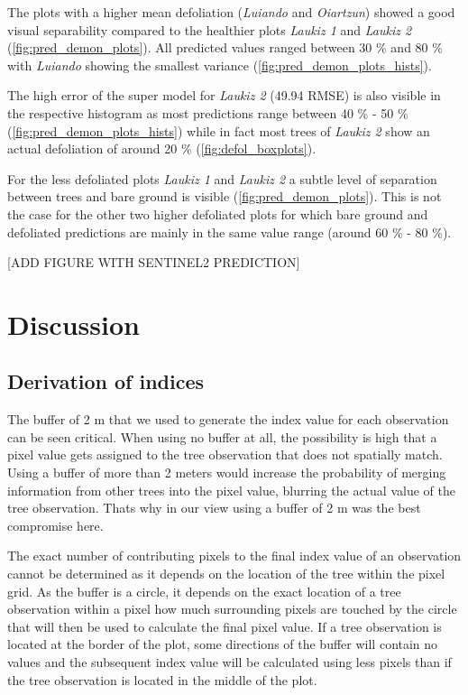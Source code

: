 \documentclass[review]{elsarticle}
\begin{document}
\noindent The plots with a higher mean defoliation (\textit{Luiando} and \textit{Oiartzun}) showed a good visual separability compared to the healthier plots \textit{Laukiz 1} and \textit{Laukiz 2} (\autoref{fig:pred_demon_plots}).
All predicted values ranged between 30 \% and 80 \% with \textit{Luiando} showing the smallest variance (\autoref{fig:pred_demon_plots_hists}). 

The high error of the super model for \textit{Laukiz 2} (49.94 RMSE) is also visible in the respective histogram as most predictions range between 40 \% - 50 \% (\autoref{fig:pred_demon_plots_hists}) while in fact most trees of \textit{Laukiz 2} show an actual defoliation of around 20 \% (\autoref{fig:defol_boxplots}).

For the less defoliated plots \textit{Laukiz 1} and \textit{Laukiz 2} a subtle level of separation between trees and bare ground is visible (\autoref{fig:pred_demon_plots}).
This is not the case for the other two higher defoliated plots for which bare ground and defoliated predictions are mainly in the same value range (around 60 \% - 80 \%).

[ADD FIGURE WITH SENTINEL2 PREDICTION]

\section{Discussion}

\subsection{Derivation of indices}

\noindent The buffer of 2 m that we used to generate the index value for each observation can be seen critical.
When using no buffer at all, the possibility is high that a pixel value gets assigned to the tree observation that does not spatially match.
Using a buffer of more than 2 meters would increase the probability of merging information from other trees into the pixel value, blurring the actual value of the tree observation.
Thats why in our view using a buffer of 2 m was the best compromise here.

The exact number of contributing pixels to the final index value of an observation cannot be determined as it depends on the location of the tree within the pixel grid.
As the buffer is a circle, it depends on the exact location of a tree observation within a pixel how much surrounding pixels are touched by the circle that will then be used to calculate the final pixel value.
If a tree observation is located at the border of the plot, some directions of the buffer will contain no values and the subsequent index value will be calculated using less pixels than if the tree observation is located in the middle of the plot.
\end{document}
